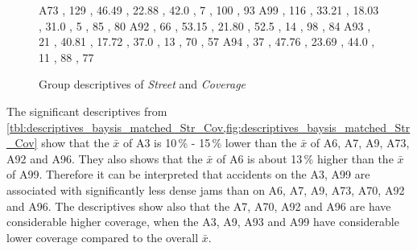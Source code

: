 \begin{figure}[ht!]
\begin{minipage}{0.55\textwidth}
{			A73 , 129 , 46.49 , 22.88 , 42.0 , 7  , 100 , 93 
			A99 , 116 , 33.21 , 18.03 , 31.0 , 5  , 85  , 80 
			A92 , 66  , 53.15 , 21.80 , 52.5 , 14 , 98  , 84 
			A93 , 21  , 40.81 , 17.72 , 37.0 , 13 , 70  , 57 
			A94 , 37  , 47.76 , 23.69 , 44.0 , 11 , 88  , 77 
		}\data
        \pgfplotstablesort[sort key=mean, sort cmp=float >]{\datasorted}{\data}
        \tiny
        \centering
		\label{fig:descriptives_baysis_matched_Str_Cov}
	\end{minipage}%
	\caption{Group descriptives of \textit{Street} and \textit{Coverage}}
\end{figure}
The significant descriptives from \cref{tbl:descriptives_baysis_matched_Str_Cov,fig:descriptives_baysis_matched_Str_Cov} show that the $\bar{x}$ of A3 is 10\,\% - 15\,\% lower than the $\bar{x}$ of A6, A7, A9, A73, A92 and A96. They also shows that the $\bar{x}$ of A6 is about 13\,\% higher than the $\bar{x}$ of A99. Therefore it can be interpreted that accidents on the A3, A99 are associated with significantly less dense jams than on A6, A7, A9, A73, A70, A92 and A96. The descriptives show also that the A7, A70, A92 and A96 are have considerable higher coverage, when the A3, A9, A93 and A99 have considerable lower coverage compared to the overall $\bar{x}$.

\label{ana:baysis_global_Kat}
 

